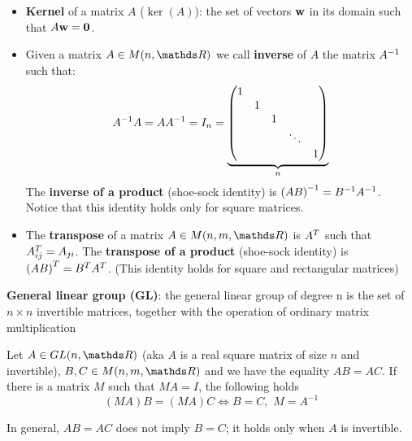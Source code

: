 \documentclass[computationalMathematics.tex]{subfiles}
\begin{document}
\begin{itemize}
     \item \textbf{Kernel} of a matrix $A$ ($\ker(A)$):  the set of vectors ${\bf w }$ in its domain such that $A{\bf w }={\bf 0 }$.

     \item Given a matrix $A \in M(n, \R)$ we call \textbf{inverse} of $A$ the matrix ${A}^{-1}$ such that:
       \[  
       {A}^{-1} A = A {A}^{-1} = I_{n} =
         \underbrace{\begin{pmatrix}
                1\\
                & 1\\
                & & 1\\
                & & & \ddots\\
                & & & & 1
         \end{pmatrix}}_{n}
         \]
         The \textbf{inverse of a product} (shoe-sock identity) is ${(A B)}^{-1} = {B}^{-1} {A}^{-1}$. Notice that this identity holds only for square matrices.

     \item The \textbf{transpose} of a matrix $A \in M(n, m, \R)$ is ${A}^{T}$ such that ${A}^{T}_{ij} = A_{ji}$. The \textbf{transpose of a product} (shoe-sock identity) is ${(A B)}^{T} = {B}^{T} {A}^{T}$. (This identity holds for square and rectangular matrices)

\end{itemize} 

\begin{definition}
  \textbf{General linear group (GL)}: the general linear group of degree n is the set of $n\times n$ invertible matrices, together with the operation of ordinary matrix multiplication
\end{definition}

\begin{proposition}
  Let $A \in GL(n, \R)$ (aka $A$ is a real square matrix of size $n$ and invertible), $B, C \in M(n, m, \R)$ and we have the equality $AB = AC$.
  If there is a matrix $M$ such that $MA = I$, the following holds
  \[
    (MA)B = (MA)C \Longleftrightarrow B=C, \,\, M = A^{-1}
  \]
\end{proposition}
\noindent
In general, $AB = AC$ does not imply $B = C$; it holds only when $A$ is invertible.

\end{document}
